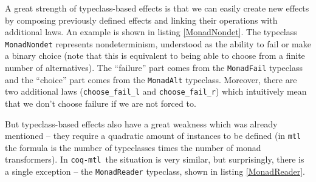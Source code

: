 \documentclass[declaration,inz,english,shortabstract]{iithesis}
\newcommand{\libname}{\m{coq-mtl}}
\newcommand{\m}[1]{\texttt{#1}}
\begin{document}

A great strength of typeclass-based effects is that we can easily create new effects by composing previously defined effects and linking their operations with additional laws. An example is shown in listing \ref{MonadNondet}. The typeclass \m{MonadNondet} represents nondeterminism, understood as the ability to fail or make a binary choice (note that this is equivalent to being able to choose from a finite number of alternatives). The ``failure'' part comes from the \m{MonadFail} typeclass and the ``choice'' part comes from the \m{MonadAlt} typeclass. Moreover, there are two additional laws (\m{choose\_fail\_l} and \m{choose\_fail\_r}) which intuitively mean that we don't choose failure if we are not forced to.



But typeclass-based effects also have a great weakness which was already mentioned -- they require a quadratic amount of instances to be defined (in \m{mtl} the formula is the number of typeclasses times the number of monad transformers). In \libname\ the situation is very similar, but surprisingly, there is a single exception -- the \m{MonadReader} typeclass, shown in listing \ref{MonadReader}.
\end{document}
